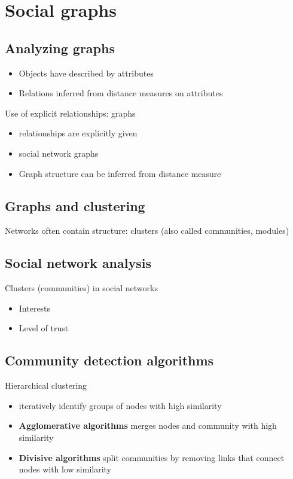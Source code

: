 \section{Social graphs}
\subsection{Analyzing graphs}
\begin{itemize}
\item Objects have described by attributes
\item Relations inferred from distance measures on attributes
\end{itemize}

Use of explicit relationships: graphs
\begin{itemize}
\item relationships are explicitly given
\item social network graphs
\item Graph structure can be inferred from distance measure
\end{itemize}

\subsection{Graphs and clustering}
Networks often contain structure: clusters (also called communities,
modules)

\subsection{Social network analysis}
Clusters (communities) in social networks
\begin{itemize}
\item Interests
\item Level of trust
\end{itemize}

\subsection{Community detection algorithms}
Hierarchical clustering
\begin{itemize}
\item iteratively identify groups of nodes with high similarity
\item \textbf{Agglomerative algorithms} merges nodes and community
  with high similarity
\item \textbf{Divisive algorithms} split communities by removing links
  that connect nodes with low similarity
\end{itemize}

